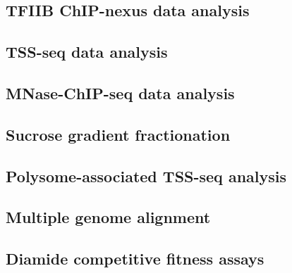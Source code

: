 \subsection{TFIIB ChIP-nexus data analysis}

\subsection{TSS-seq data analysis}

\subsection{MNase-ChIP-seq data analysis}

\subsection{Sucrose gradient fractionation}

\subsection{Polysome-associated TSS-seq analysis}

\subsection{Multiple genome alignment}

\subsection{Diamide competitive fitness assays}

\newpage

\begingroup
\singlespacing

\endgroup
